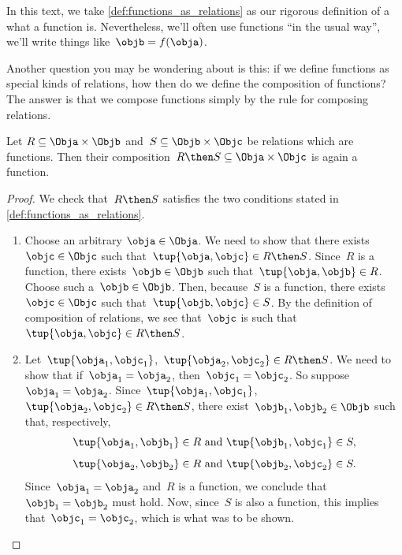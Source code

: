 In this text, we take \cref{def:functions_as_relations} as our rigorous definition of a what a function is. Nevertheless, we'll often use functions ``in the usual way'',  we'll write things like~$\objb = f(\obja)$.

Another question you may be wondering about is this: if we define functions as special kinds of relations, how then do we define the composition of functions? The answer is that we compose functions simply by the rule for composing relations.

\begin{lemma}
  \label{lemma:comprelfun}
  Let $R \subseteq \Obja \times \Objb$ and~$S \subseteq \Objb \times \Objc$ be relations which are functions. Then their composition~$R \then S \subseteq \Obja \times \Objc$ is again a function.
\end{lemma}

\begin{proof}
  We check that~$R \then S$ satisfies the two conditions stated in \cref{def:functions_as_relations}.

  \begin{enumerate}
    \item Choose an arbitrary $\obja \in \Obja$. We need to show that there exists~$\objc \in \Objc$ such that~$\tup{\obja,\objc} \in R \then S$. Since~$R$ is a function, there exists~$\objb \in \Objb$ such that~$\tup{\obja,\objb} \in R$. Choose such a~$\objb \in \Objb$. Then, because~$S$ is a function, there exists~$\objc \in \Objc$ such that~$\tup{\objb,\objc} \in S$. By the definition of composition of relations, we see that~$\objc$ is such that~$\tup{\obja,\objc} \in R \then S$.
    \item Let~$\tup{\obja_1, \objc_1}$,~$\tup{\obja_2,\objc_2} \in R \then S$. We need to show that if~$\obja_1 = \obja_2$, then~$\objc_1 = \objc_2$. So suppose~$\obja_1 = \obja_2$. Since~$\tup{\obja_1, \objc_1}$,~$\tup{\obja_2,\objc_2} \in R \then S$, there exist~$\objb_1, \objb_2 \in \Objb$ such that, respectively,
    \begin{equation*}
      \tup{\obja_1, \objb_1} \in R \text{ and } \tup{\objb_1, \objc_1} \in S,
    \end{equation*}
    \begin{equation*}
      \tup{\obja_2, \objb_2} \in R \text{ and } \tup{\objb_2, \objc_2} \in S.
    \end{equation*}
    Since~$\obja_1 = \obja_2$ and~$R$ is a function, we conclude that~$\objb_1 = \objb_2$ must hold. Now, since~$S$ is also a function, this implies that~$\objc_1 = \objc_2$, which is what was to be shown.
  \end{enumerate}
\end{proof}

